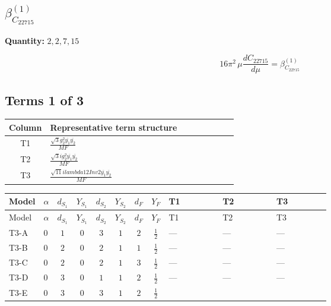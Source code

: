\documentclass[8pt]{article}
\begin{document}
\begin{landscape}
\section*{$\beta_{C_{22715}}^{(1)}$}
\noindent\textbf{Quantity: }$\mathrm{2,2,7,15}$\par\smallskip
\[16\pi^2\,\mu\frac{d C_{22715}}{d\mu}=\beta_{C_{22715}}^{(1)}\]
\subsection*{Terms 1 of 3}
\begin{center}
\begin{tabular}{@{}c >{\raggedright\arraybackslash}p{0.82\linewidth}@{}}
\toprule
Column & Representative term structure \\
\midrule
T1 & \(\displaystyle \frac{\sqrt{3} g_{2}^{2} \overline{y_{1}} \overline{y_{2}}}{MF}\) \\
\midrule
T2 & \(\displaystyle \frac{\sqrt{3} i g_{2}^{2} \overline{y_{1}} \overline{y_{2}}}{MF}\) \\
\midrule
T3 & \(\displaystyle \frac{\sqrt{11} i lambda12Inv2 \overline{y_{1}} \overline{y_{2}}}{MF}\) \\
\midrule
\bottomrule
\end{tabular}
\end{center}
\smallskip
\tiny
\begin{longtable}{@{}llcccccc >{\raggedright\arraybackslash}p{0.21\linewidth} >{\raggedright\arraybackslash}p{0.21\linewidth} >{\raggedright\arraybackslash}p{0.21\linewidth}@{}}
\toprule
Model & $\alpha$ & $d_{S_1}$ & $Y_{S_1}$ & $d_{S_2}$ & $Y_{S_2}$ & $d_F$ & $Y_F$ & T1 & T2 & T3 \\
\midrule
\endfirsthead
\toprule
Model & $\alpha$ & $d_{S_1}$ & $Y_{S_1}$ & $d_{S_2}$ & $Y_{S_2}$ & $d_F$ & $Y_F$ & T1 & T2 & T3 \\
\midrule
\endhead
T3-A & $0$ & $1$ & $0$ & $3$ & $1$ & $2$ & $\frac{1}{2}$ & --- & --- & --- \\
\midrule
T3-B & $0$ & $2$ & $0$ & $2$ & $1$ & $1$ & $\frac{1}{2}$ & --- & --- & --- \\
\midrule
T3-C & $0$ & $2$ & $0$ & $2$ & $1$ & $3$ & $\frac{1}{2}$ & --- & --- & --- \\
\midrule
T3-D & $0$ & $3$ & $0$ & $1$ & $1$ & $2$ & $\frac{1}{2}$ & --- & --- & --- \\
\midrule
T3-E & $0$ & $3$ & $0$ & $3$ & $1$ & $2$ & $\frac{1}{2}$ & \scriptsize\adjustbox{max width=\linewidth}{$\begin{gathered} \frac{\sqrt{3} g_{2}^{2} \overline{y_{1}} \overline{y_{2}}}{6 MF}\end{gathered}$} & \scriptsize\adjustbox{max width=\linewidth}{$\begin{gathered} - \frac{49 \sqrt{3} i g_{2}^{2} \overline{y_{1}} \overline{y_{2}}}{24 MF}\end{gathered}$} & \scriptsize\adjustbox{max width=\linewidth}{$\begin{gathered} - \frac{3 \sqrt{11} i lambda12Inv2 \overline{y_{1}} \overline{y_{2}}}{22 MF}\end{gathered}$} \\

\end{longtable}
\end{landscape}
\end{document}
